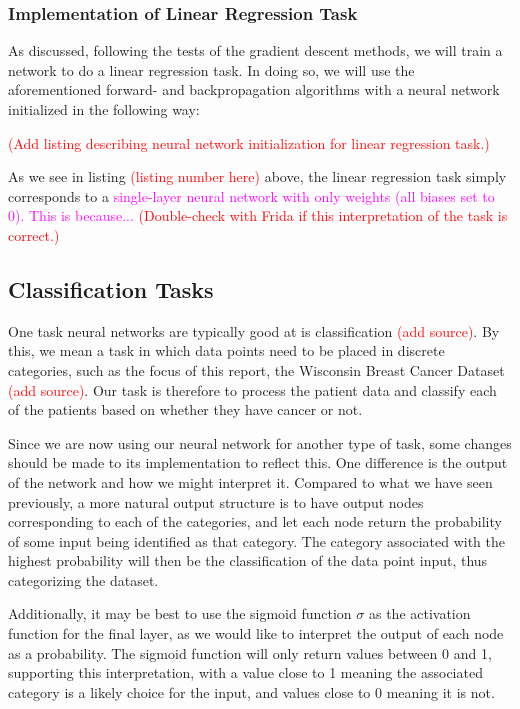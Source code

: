 \subsubsection{Implementation of Linear Regression Task}
As discussed, following the tests of the gradient descent methods, we will train a network to do a linear regression task. In doing so, we will use the aforementioned forward- and backpropagation algorithms with a neural network initialized in the following way:

\textcolor{red}{(Add listing describing neural network initialization for linear regression task.)}

As we see in listing \textcolor{red}{(listing number here)} above, the linear regression task simply corresponds to a \textcolor{magenta}{single-layer neural network with only weights (all biases set to 0). This is because...} \textcolor{red}{(Double-check with Frida if this interpretation of the task is correct.)}

\subsection{Classification Tasks}
One task neural networks are typically good at is classification \textcolor{red}{(add source)}. By this, we mean a task in which data points need to be placed in discrete categories, such as the focus of this report, the Wisconsin Breast Cancer Dataset \textcolor{red}{(add source)}. Our task is therefore to process the patient data and classify each of the patients based on whether they have cancer or not. 

Since we are now using our neural network for another type of task, some changes should be made to its implementation to reflect this. One difference is the output of the network and how we might interpret it. Compared to what we have seen previously, a more natural output structure is to have output nodes corresponding to each of the categories, and let each node return the probability of some input being identified as that category. The category associated with the highest probability will then be the classification of the data point input, thus categorizing the dataset. 

Additionally, it may be best to use the sigmoid function $\sigma$ as the activation function for the final layer, as we would like to interpret the output of each node as a probability. The sigmoid function will only return values between 0 and 1, supporting this interpretation, with a value close to 1 meaning the associated category is a likely choice for the input, and values close to 0 meaning it is not. 

